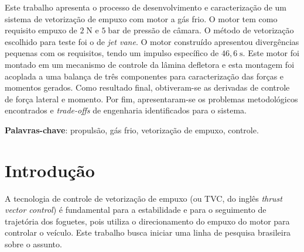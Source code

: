 \documentclass[
	article,			%
	10pt,				%
	oneside,			%
	a4paper,			%
  twocolumn,			%
	english,			%
	brazil,				%
	sumario=tradicional,
	]{abntex2}
\begin{document}

\frenchspacing


\maketitle

\begin{resumoumacoluna}
Este trabalho apresenta o processo de desenvolvimento e caracterização de um sistema de vetorização de empuxo com motor a gás frio. O motor tem como requisito empuxo de \(2\;\mathrm{N}\) e \(5\;\mathrm{bar}\) de pressão de câmara. O método de vetorização escolhido para teste foi o de \textit{jet vane}. O motor construído apresentou divergências pequenas com os requisitos, tendo um impulso específico de \(46,6\;\mathrm{s}\). Este motor foi montado em um mecanismo de controle da lâmina defletora e esta montagem foi acoplada a uma balança de três componentes para caracterização das forças e momentos gerados. Como resultado final, obtiveram-se as derivadas de controle de força lateral e momento. Por fim, apresentaram-se os problemas metodológicos encontrados e \textit{trade-offs} de engenharia identificados para o sistema.
 \vspace{\onelineskip}

 \noindent
 \textbf{Palavras-chave}: propulsão, gás frio, vetorização de empuxo, controle.
\end{resumoumacoluna}

\textual
\section{Introdução}

A tecnologia de controle de vetorização de empuxo (ou TVC, do inglês \textit{thrust vector control}) é fundamental para a estabilidade e para o seguimento de trajetória dos foguetes, pois utiliza o direcionamento do empuxo do motor para controlar o veículo. Este trabalho busca iniciar uma linha de pesquisa brasileira sobre o assunto.
\end{document}

